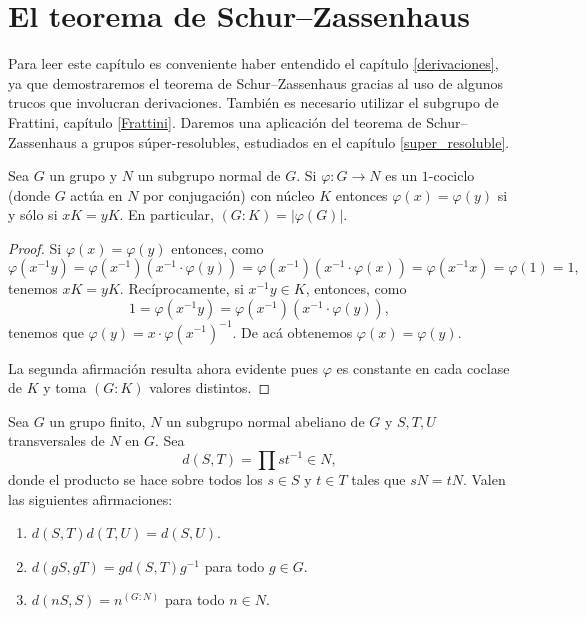\chapter{El teorema de Schur--Zassenhaus}
\label{SchurZassenhaus}

Para leer este capítulo es conveniente haber entendido el capítulo \ref{derivaciones}, ya
que demostraremos el teorema de Schur--Zassenhaus gracias al uso de algunos trucos que
involucran derivaciones. También es necesario utilizar el subgrupo de Frattini, capítulo \ref{Frattini}. 
Daremos una aplicación 
del teorema de Schur--Zassenhaus a grupos súper-resolubles, estudiados en el capítulo \ref{super_resoluble}. 

\begin{lemma}
	\label{lemma:1cocycle}
	Sea $G$ un grupo y $N$ un subgrupo normal de $G$. 
	Si $\varphi\colon G\to N$ es un $1$-cociclo (donde $G$ actúa en $N$ por conjugación) con núcleo $K$ entonces
	$\varphi(x)=\varphi(y)$ si y sólo si $xK=yK$. En particular,
	$(G:K)=|\varphi(G)|$. 
\end{lemma}

\begin{proof}
	Si $\varphi(x)=\varphi(y)$ entonces, como 
	\[
		\varphi(x^{-1}y)
		=\varphi(x^{-1})(x^{-1}\cdot\varphi(y))
		=\varphi(x^{-1})(x^{-1}\cdot\varphi(x))
		=\varphi(x^{-1}x)=\varphi(1)
		=1,
	\]
	tenemos $xK=yK$. Recíprocamente, si $x^{-1}y\in K$, entonces, como 
	\[
	1=\varphi(x^{-1}y)=\varphi(x^{-1})(x^{-1}\cdot \varphi(y)),
	\]
	tenemos que $\varphi(y)=x\cdot\varphi(x^{-1})^{-1}$. De acá obtenemos
	$\varphi(x)=\varphi(y)$.

	La segunda afirmación resulta ahora evidente pues $\varphi$ es constante en
	cada coclase de $K$ y toma $(G:K)$ valores distintos. 
\end{proof}

\begin{lemma}
	\label{lemma:d}
	Sea $G$ un grupo finito, $N$ un subgrupo normal abeliano de $G$ y $S,T,U$
	transversales de $N$ en $G$. Sea 
	\[
	d(S,T)=\prod st^{-1}\in N,
	\]
	donde el producto se hace sobre todos los $s\in S$ y $t\in T$ tales que
	$sN=tN$. Valen las siguientes afirmaciones:
	\begin{enumerate}
		\item $d(S,T)d(T,U)=d(S,U)$.
		\item $d(gS,gT)=gd(S,T)g^{-1}$ para todo $g\in G$.
		\item $d(nS,S)=n^{(G:N)}$ para todo $n\in N$.
	\end{enumerate}
\end{lemma}

